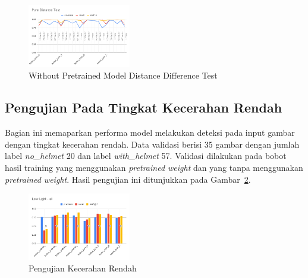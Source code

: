 \begin{figure}[ht]
  \centering
  \includegraphics[width=0.4\textwidth]{gambar/utilities/pure_dist_test.png}
  \caption{Without Pretrained Model Distance Difference Test}
  \label{fig:pure_dist_test}  
\end{figure}

\subsection{Pengujian Pada Tingkat Kecerahan Rendah}
\label{subsec:model_lowillum_test}


\par Bagian ini memaparkan performa model melakukan
deteksi pada input gambar dengan tingkat kecerahan rendah. Data validasi berisi
35 gambar dengan jumlah label \emph{no\_helmet} 20 dan label \emph{with\_helmet} 57.
Validasi dilakukan pada bobot hasil training yang menggunakan \textit{pretrained weight} dan yang tanpa menggunakan \textit{pretrained weight}. Hasil pengujian ini ditunjukkan pada Gambar~\ref{fig:lowillum_test}.

\begin{figure}[ht]
  \centering
  \includegraphics[width=0.4\textwidth]{gambar/utilities/lowlight_test.png}
  \caption{Pengujian Kecerahan Rendah}
  \label{fig:lowillum_test}  
\end{figure}

